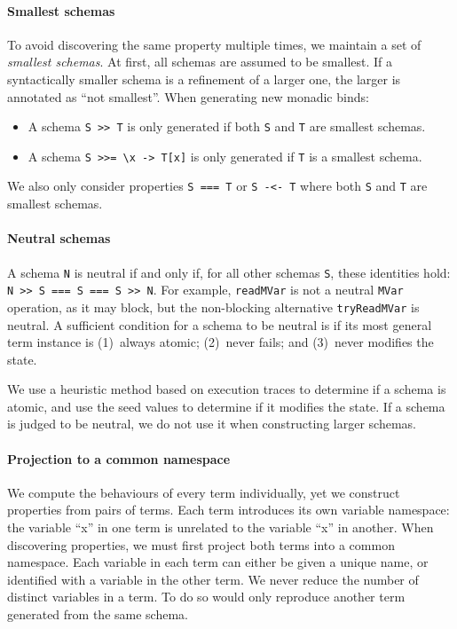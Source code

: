\paragraph{Smallest schemas}
To avoid discovering the same property multiple times, we maintain a
set of \emph{smallest schemas}.  At first, all schemas are assumed to
be smallest.  If a syntactically smaller schema is a refinement of a
larger one, the larger is annotated as ``not smallest''.  When
generating new monadic binds:

\begin{itemize}
\item A schema \verb|S >> T| is only generated if both \verb|S| and
  \verb|T| are smallest schemas.
\item A schema \verb|S >>= \x -> T[x]| is only generated if \verb|T|
  is a smallest schema.
\end{itemize}

We also only consider properties \verb|S === T| or \verb|S -<- T|
where both \verb|S| and \verb|T| are smallest schemas.

\paragraph{Neutral schemas}
A schema \verb|N| is neutral if and only if, for all other schemas
\verb|S|, these identities hold: \verb|N >> S === S === S >> N|.  For
example, \verb|readMVar| is not a neutral \verb|MVar| operation, as it
may block, but the non-blocking alternative \verb|tryReadMVar| is
neutral.  A sufficient condition for a schema to be neutral is if its
most general term instance is (1)~always atomic; (2)~never fails; and
(3)~never modifies the state.

We use a heuristic method based on execution traces to determine if a
schema is atomic, and use the seed values to determine if it modifies
the state.  If a schema is judged to be neutral, we do not use it when
constructing larger schemas.

\paragraph{Projection to a common namespace}
We compute the behaviours of every term individually, yet we construct
properties from pairs of terms.  Each term introduces its own variable
namespace: the variable ``x'' in one term is unrelated to the variable
``x'' in another.  When discovering properties, we must first project
both terms into a common namespace.  Each variable in each term can
either be given a unique name, or identified with a variable in the
other term.  We never reduce the number of distinct variables in a
term.  To do so would only reproduce another term generated from the
same schema.

